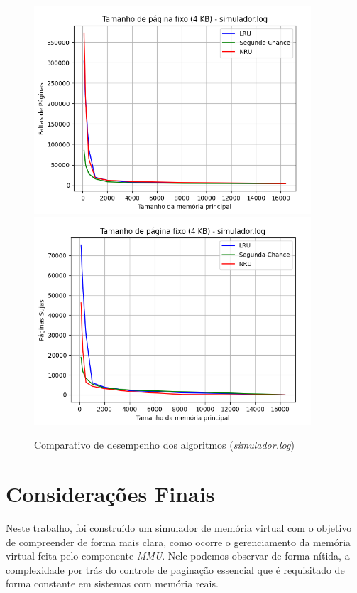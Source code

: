 \documentclass[a4paper, 12pt]{article}
\begin{document}
\begin{figure}[H]
    \centering
    \includegraphics[width=0.92\textwidth]{fixed_pag/simulador/fault.png}
    \hspace{1.5cm}
    \includegraphics[width=0.92\textwidth]{fixed_pag/simulador/write.png}
    \caption{Comparativo de desempenho dos algoritmos (\emph{simulador.log})}
    \label{fig:exampleFig8}
\end{figure}

\section{Considerações Finais}

Neste trabalho, foi construído um simulador de memória virtual com o objetivo de compreender de forma mais clara, como ocorre o gerenciamento da memória virtual feita pelo componente \emph{MMU}. Nele podemos observar de forma nítida, a complexidade por trás do controle de paginação essencial que é requisitado de forma constante em sistemas com memória reais. 
\end{document}
